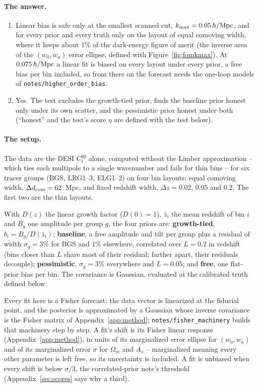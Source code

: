 \documentclass[11pt]{article}
\newcommand{\kmax}{k_{\rm max}}
\newcommand{\hMpc}{\,h/{\rm Mpc}}
\begin{document}
\paragraph{The answer.}
\begin{enumerate}
  \item Linear bias is safe only at the smallest scanned cut,
    $\kmax = 0.05\hMpc$, and for every prior and every truth only on
    the layout of equal comoving width, where it keeps about $1\%$ of
    the dark-energy figure of merit (the inverse area of the
    $(w_0, w_a)$ error ellipse, defined with
    Figure~\ref{fig:fomkmax}).  At $0.075\hMpc$ a linear fit is
    biased on every layout under every prior, a free bias per bin
    included, so from there on the forecast needs the one-loop models
    of \texttt{notes/higher\_order\_bias}.
  \item Yes.  The test excludes the growth-tied prior, finds the
    baseline prior honest only under its own scatter, and the
    pessimistic prior honest under both (``honest'' and the test's
    score $\eta$ are defined with the test below).
\end{enumerate}

\paragraph{The setup.}
The data are the DESI $C_\ell^{gg}$ alone, computed without the
Limber approximation -- which ties each multipole to a single
wavenumber and fails for thin bins -- for six tracer groups (BGS,
LRG1--3, ELG1--2)
on four bin layouts: equal comoving width,
$\Delta d_{\rm com} = 62$~Mpc, and fixed redshift width,
$\Delta z = 0.02$, $0.05$ and $0.2$.  The first two are the thin
layouts.

With $D(z)$ the linear growth factor ($D(0) = 1$), $\bar{z}_i$ the
mean redshift of bin $i$ and $B_g$ one amplitude per group $g$, the
four priors are: \textbf{growth-tied}, $b_i = B_g/D(\bar{z}_i)$;
\textbf{baseline}, a free amplitude and tilt per group plus a
residual of width $\sigma_g = 3\%$ for BGS and $1\%$ elsewhere,
correlated over $L = 0.2$ in redshift (bins closer than $L$ share
most of their residual; farther apart, their residuals decouple);
\textbf{pessimistic},
$\sigma_g = 3\%$ everywhere and $L = 0.05$; and \textbf{free}, one
flat-prior bias per bin.  The covariance is Gaussian, evaluated at
the calibrated truth defined below.

Every fit here is a Fisher forecast: the data vector is linearized at
the fiducial point, and the posterior is approximated by a Gaussian
whose inverse covariance is the Fisher matrix of
Appendix~\ref{app:method}; \texttt{notes/fisher\_machinery} builds
that machinery step by step.  A fit's shift is its Fisher linear
response (Appendix~\ref{app:method}),
in units of its marginalized error ellipse for $(w_0, w_a)$ and of
its marginalized error $\sigma$ for $\Omega_m$ and $A_s$ --
marginalized meaning every other parameter is left free, so its
uncertainty is included.  A fit is
unbiased when every shift is below $\sigma/3$, the correlated-prior
note's threshold (Appendix~\ref{sec:scores} says why a third).
\end{document}
